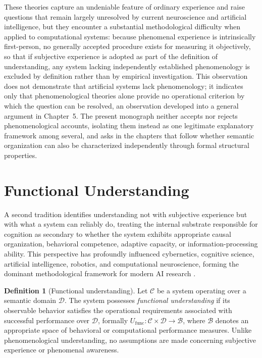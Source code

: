 \documentclass[11pt,twoside,openright]{book}
\numberwithin{equation}{chapter}
\theoremstyle{definition}
\newtheorem{definition}{Definition}[chapter]
\theoremstyle{plain}
\theoremstyle{remark}
\theoremstyle{definition}
\newcommand{\Domain}{\mathcal{D}}
\newcommand{\System}{\mathcal{C}}
\begin{document}
These theories capture an undeniable feature of ordinary experience and
raise questions that remain largely unresolved by current neuroscience
and artificial intelligence, but they encounter a substantial
methodological difficulty when applied to computational systems: because
phenomenal experience is intrinsically first-person, no generally
accepted procedure exists for measuring it objectively, so that if
subjective experience is adopted as part of the definition of
understanding, any system lacking independently established phenomenology
is excluded by definition rather than by empirical investigation. This
observation does not demonstrate that artificial systems lack
phenomenology; it indicates only that phenomenological theories alone
provide no operational criterion by which the question can be resolved,
an observation developed into a general argument in Chapter~5. The
present monograph neither accepts nor rejects phenomenological accounts,
isolating them instead as one legitimate explanatory framework among
several, and asks in the chapters that follow whether semantic
organization can also be characterized independently through formal
structural properties.

\section{Functional Understanding}

A second tradition identifies understanding not with subjective
experience but with what a system can reliably do, treating the internal
substrate responsible for cognition as secondary to whether the system
exhibits appropriate causal organization, behavioral competence, adaptive
capacity, or information-processing ability. This perspective has
profoundly influenced cybernetics, cognitive science, artificial
intelligence, robotics, and computational neuroscience, forming the
dominant methodological framework for modern AI research
\cite{Turing1950,Putnam1967,Fodor1975,NewellSimon1976}.

\begin{definition}[Functional understanding]
Let $\System$ be a system operating over a semantic domain $\Domain$. The
system possesses \emph{functional understanding} if its observable
behavior satisfies the operational requirements associated with
successful performance over $\Domain$, formally
$U_{\mathrm{func}}:\System\times\Domain\to\mathcal{B}$, where
$\mathcal{B}$ denotes an appropriate space of behavioral or computational
performance measures. Unlike phenomenological understanding, no
assumptions are made concerning subjective experience or phenomenal
awareness.
\end{definition}
\end{document}
